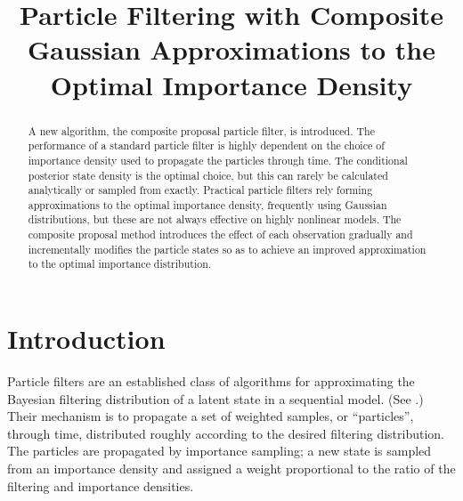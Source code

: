 \documentclass[conference]{IEEEtran}
\begin{document}
\title{Particle Filtering with Composite Gaussian Approximations to the Optimal Importance Density}
\author{
}

\maketitle

\begin{abstract}
A new algorithm, the composite proposal particle filter, is introduced. The performance of a standard particle filter is highly dependent on the choice of importance density used to propagate the particles through time. The conditional posterior state density is the optimal choice, but this can rarely be calculated analytically or sampled from exactly. Practical particle filters rely forming approximations to the optimal importance density, frequently using Gaussian distributions, but these are not always effective on highly nonlinear models. The composite proposal method introduces the effect of each observation gradually and incrementally modifies the particle states so as to achieve an improved approximation to the optimal importance distribution.
\end{abstract}


\IEEEpeerreviewmaketitle



\section{Introduction}

Particle filters are an established class of algorithms for approximating the Bayesian filtering distribution of a latent state in a sequential model. (See \cite{Cappe2007,Doucet2009}.) Their mechanism is to propagate a set of weighted samples, or ``particles'', through time, distributed roughly according to the desired filtering distribution. The particles are propagated by importance sampling; a new state is sampled from an importance density and assigned a weight proportional to the ratio of the filtering and importance densities.
\end{document}
